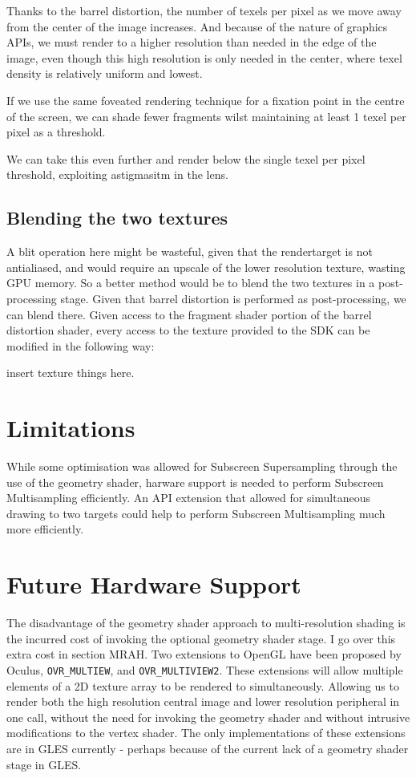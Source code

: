 \documentclass[12pt,a4paper,twoside,openright]{report}
\begin{document}
Thanks to the barrel distortion, the number of texels per pixel as we move away from the center of the image increases. And because of the nature of graphics APIs, we must render to a higher resolution than needed in the edge of the image, even though this high resolution is only needed in the center, where texel density is relatively uniform and lowest.

If we use the same foveated rendering technique for a fixation point in the centre of the screen, we can shade fewer fragments wilst maintaining at least 1 texel per pixel as a threshold.

We can take this even further and render below the single texel per pixel threshold, exploiting astigmasitm in the lens.

\subsection{Blending the two textures}

A blit operation here might be wasteful, given that the rendertarget is not antialiased, and would require an upscale of the lower resolution texture, wasting GPU memory. So a better method would be to blend the two textures in a post-processing stage. Given that barrel distortion is performed as post-processing, we can blend there. Given access to the fragment shader portion of the barrel distortion shader, every access to the texture provided to the SDK can be modified in the following way:

\begin{blockcode}
insert texture things here.
\end{blockcode}

\section{Limitations}

While some optimisation was allowed for Subscreen Supersampling through the use of the geometry shader, harware support is needed to perform Subscreen Multisampling efficiently. An API extension that allowed for simultaneous drawing to two targets could help to perform Subscreen Multisampling much more efficiently. 

\section{Future Hardware Support}

The disadvantage of the geometry shader approach to multi-resolution shading is the incurred cost of invoking the optional geometry shader stage. I go over this extra cost in section MRAH.
Two extensions to OpenGL have been proposed by Oculus, \texttt{OVR\_MULTIEW}, and \texttt{OVR\_MULTIVIEW2}. These extensions will allow multiple elements of a 2D texture array to be rendered to simultaneously. Allowing us to render both the high resolution central image and lower resolution peripheral in one call, without the need for invoking the geometry shader and without intrusive modifications to the vertex shader. The only implementations of these extensions are in GLES currently - perhaps because of the current lack of a geometry shader stage in GLES.
\end{document}

